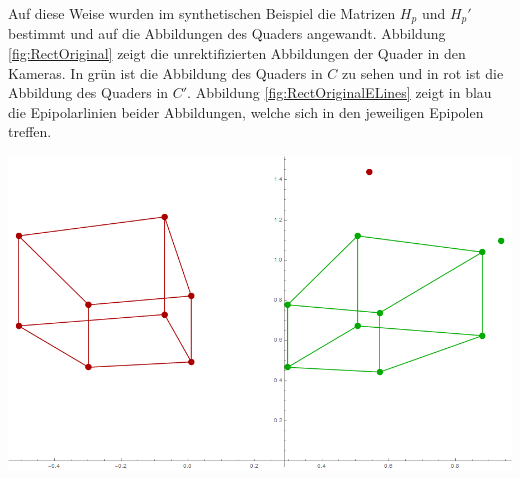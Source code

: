 Auf diese Weise wurden im synthetischen Beispiel die Matrizen $H_p$ und $H_p'$ bestimmt und auf die Abbildungen des Quaders angewandt. Abbildung \ref{fig:RectOriginal} zeigt die unrektifizierten Abbildungen der Quader in den Kameras. In grün ist die Abbildung des Quaders in $C$ zu sehen und in rot ist die Abbildung des Quaders in $C'$. Abbildung \ref{fig:RectOriginalELines} zeigt in blau die Epipolarlinien beider Abbildungen, welche sich in den jeweiligen Epipolen treffen. 



\begin{minipage}{\linewidth}
	\centering
	\includegraphics[width=.8\linewidth]{images/Rectification_one_same_Solutions.png}
	\label{fig:RectOriginal} 
\end{minipage}\\ 

